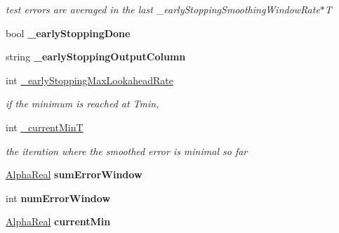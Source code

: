 \begin{DoxyCompactItemize}
\begin{DoxyCompactList}\small\item\em test errors are averaged in the last \-\_\-early\-Stopping\-Smoothing\-Window\-Rate$\ast$\-T \end{DoxyCompactList}\item 
\hypertarget{classMultiBoost_1_1AdaBoostMHLearner_ab45304a1270a4f23ceda87c70a84cb45}{bool {\bfseries \-\_\-early\-Stopping\-Done}}\label{classMultiBoost_1_1AdaBoostMHLearner_ab45304a1270a4f23ceda87c70a84cb45}

\item 
\hypertarget{classMultiBoost_1_1AdaBoostMHLearner_aba5c79624c7628d5c1aed225dcaa0151}{string {\bfseries \-\_\-early\-Stopping\-Output\-Column}}\label{classMultiBoost_1_1AdaBoostMHLearner_aba5c79624c7628d5c1aed225dcaa0151}

\item 
\hypertarget{classMultiBoost_1_1AdaBoostMHLearner_acca83106fa1d58750d00dfdbfcc85d2d}{int \hyperlink{classMultiBoost_1_1AdaBoostMHLearner_acca83106fa1d58750d00dfdbfcc85d2d}{\-\_\-early\-Stopping\-Max\-Lookahead\-Rate}}\label{classMultiBoost_1_1AdaBoostMHLearner_acca83106fa1d58750d00dfdbfcc85d2d}

\begin{DoxyCompactList}\small\item\em if the minimum is reached at Tmin, \end{DoxyCompactList}\item 
\hypertarget{classMultiBoost_1_1AdaBoostMHLearner_af104d5111150afc00187df762a42defd}{int \hyperlink{classMultiBoost_1_1AdaBoostMHLearner_af104d5111150afc00187df762a42defd}{\-\_\-current\-Min\-T}}\label{classMultiBoost_1_1AdaBoostMHLearner_af104d5111150afc00187df762a42defd}

\begin{DoxyCompactList}\small\item\em the iteration where the smoothed error is minimal so far \end{DoxyCompactList}\item 
\hypertarget{classMultiBoost_1_1AdaBoostMHLearner_a23e89c84081e8591624afa3ba715b395}{\hyperlink{Defaults_8h_a80184c4fd10ab70a1a17c5f97dcd1563}{Alpha\-Real} {\bfseries sum\-Error\-Window}}\label{classMultiBoost_1_1AdaBoostMHLearner_a23e89c84081e8591624afa3ba715b395}

\item 
\hypertarget{classMultiBoost_1_1AdaBoostMHLearner_ace4d2f4d53fe8c55866520ecd271d26f}{int {\bfseries num\-Error\-Window}}\label{classMultiBoost_1_1AdaBoostMHLearner_ace4d2f4d53fe8c55866520ecd271d26f}

\item 
\hypertarget{classMultiBoost_1_1AdaBoostMHLearner_a3a30133d9df2444482d6c2995b572927}{\hyperlink{Defaults_8h_a80184c4fd10ab70a1a17c5f97dcd1563}{Alpha\-Real} {\bfseries current\-Min}}\label{classMultiBoost_1_1AdaBoostMHLearner_a3a30133d9df2444482d6c2995b572927}

\end{DoxyCompactItemize}


